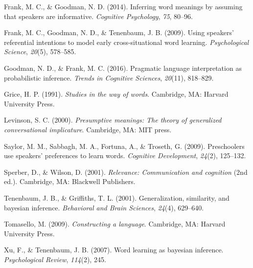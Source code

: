 \documentclass[10pt, letterpaper]{article}
\begin{document}
\hypertarget{ref-frank2014inferring}{}
Frank, M. C., \& Goodman, N. D. (2014). Inferring word meanings by
assuming that speakers are informative. \emph{Cognitive Psychology},
\emph{75}, 80--96.

\hypertarget{ref-frank2009using}{}
Frank, M. C., Goodman, N. D., \& Tenenbaum, J. B. (2009). Using
speakers' referential intentions to model early cross-situational word
learning. \emph{Psychological Science}, \emph{20}(5), 578--585.

\hypertarget{ref-goodman2016pragmatic}{}
Goodman, N. D., \& Frank, M. C. (2016). Pragmatic language
interpretation as probabilistic inference. \emph{Trends in Cognitive
Sciences}, \emph{20}(11), 818--829.

\hypertarget{ref-grice1991studies}{}
Grice, H. P. (1991). \emph{Studies in the way of words}. Cambridge, MA:
Harvard University Press.

\hypertarget{ref-levinson2000presumptive}{}
Levinson, S. C. (2000). \emph{Presumptive meanings: The theory of
generalized conversational implicature}. Cambridge, MA: MIT press.

\hypertarget{ref-saylor2009preschoolers}{}
Saylor, M. M., Sabbagh, M. A., Fortuna, A., \& Troseth, G. (2009).
Preschoolers use speakers' preferences to learn words. \emph{Cognitive
Development}, \emph{24}(2), 125--132.

\hypertarget{ref-sperber2001relevance}{}
Sperber, D., \& Wilson, D. (2001). \emph{Relevance: Communication and
cognition} (2nd ed.). Cambridge, MA: Blackwell Publishers.

\hypertarget{ref-tenenbaum2001generalization}{}
Tenenbaum, J. B., \& Griffiths, T. L. (2001). Generalization,
similarity, and bayesian inference. \emph{Behavioral and Brain
Sciences}, \emph{24}(4), 629--640.

\hypertarget{ref-tomasello2009constructing}{}
Tomasello, M. (2009). \emph{Constructing a language}. Cambridge, MA:
Harvard University Press.

\hypertarget{ref-xu2007word}{}
Xu, F., \& Tenenbaum, J. B. (2007). Word learning as bayesian inference.
\emph{Psychological Review}, \emph{114}(2), 245.


\end{document}

